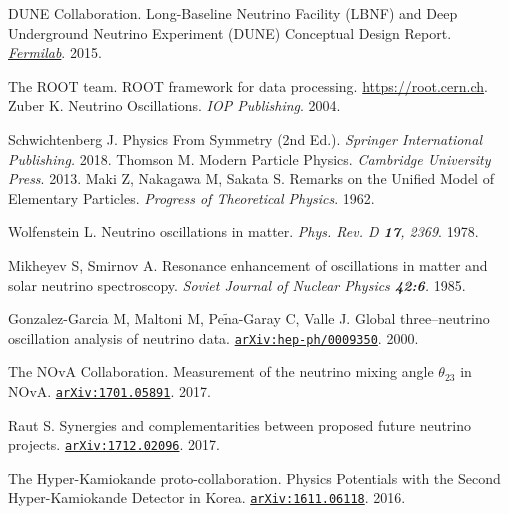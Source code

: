 \begin{thebibliography}{100}

	DUNE Collaboration. Long-Baseline Neutrino Facility (LBNF) and
		Deep Underground Neutrino Experiment (DUNE) Conceptual Design Report.
		\href{https://web.fnal.gov/project/LBNF/ReviewsAndAssessments/LBNF_DUNE\%20DOE\%20CD-1\%20Refresh\%20Review/SitePages/Conceptual\%20Design\%20Report.aspx}{\textit{Fermilab}}.
		2015.
		
	 The ROOT team. ROOT framework for data processing.
		\url{https://root.cern.ch}.
	 Zuber K. Neutrino
		Oscillations. \textit{IOP Publishing}. 2004.

	 Schwichtenberg J. Physics From Symmetry (2nd Ed.).
		\textit{Springer International Publishing.} 2018.
	 Thomson M. Modern Particle Physics. \textit{Cambridge
		University Press}. 2013.
	 Maki Z, Nakagawa M, Sakata S. Remarks on the Unified Model of
		Elementary Particles. \textit{Progress of Theoretical Physics}. 1962.

	 Wolfenstein L. Neutrino oscillations in matter.
		\textit{Phys. Rev. D \textbf{17}, 2369}. 1978.

	 Mikheyev S, Smirnov A. Resonance enhancement of
		oscillations in matter and solar neutrino spectroscopy. \textit{Soviet
		Journal of Nuclear Physics \textbf{42:6}.} 1985.

	 Gonzalez-Garcia M, Maltoni M, Pe$\tilde{\text{n}}$a-Garay C,
		Valle J. Global three–neutrino oscillation analysis of
		neutrino data.
		\href{https://arxiv.org/abs/hep-ph/0009350}{\texttt{arXiv:hep-ph/0009350}}.
		2000.

	 The NOvA Collaboration. Measurement of the neutrino mixing
		angle $\theta_{23}$ in NOvA.
		\href{https://arxiv.org/abs/1701.05891}{\texttt{arXiv:1701.05891}}. 2017.

	 Raut S. Synergies and complementarities between proposed
		future neutrino projects.
		\href{https://arxiv.org/abs/1712.02096v1}{\texttt{arXiv:1712.02096}}.
		2017.

	 The Hyper-Kamiokande proto-collaboration. Physics Potentials
		with the Second Hyper-Kamiokande Detector in Korea.
		\href{https://arxiv.org/abs/1611.06118}{\texttt{arXiv:1611.06118}}. 2016.



\end{thebibliography}
